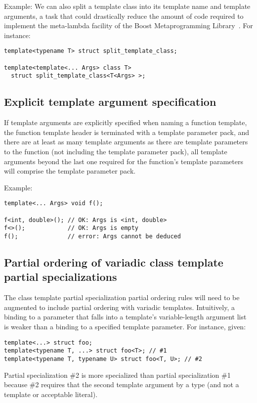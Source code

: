 \documentclass{article}
\begin{document}
Example: We can also split a template class into its template name and
template arguments, a task that could drastically reduce the amount of code required to implement the meta-lambda facility of the Boost Metaprogramming Library~\cite{Gurtovoy02}. For instance:

\begin{verbatim}
template<typename T> struct split_template_class;

template<template<... Args> class T> 
  struct split_template_class<T<Args> >;
\end{verbatim}

\subsection{Explicit template argument specification}
If template arguments are explicitly specified when naming a function
template, the function template header is terminated with a template
parameter pack, and there are at least as many template arguments as
there are template parameters to the function (not including the
template parameter pack), all template arguments beyond the last one
required for the function's template parameters will comprise the
template parameter pack.

Example:
\begin{verbatim}
template<... Args> void f();

f<int, double>(); // OK: Args is <int, double>
f<>();            // OK: Args is empty
f();              // error: Args cannot be deduced
\end{verbatim}

\subsection{Partial ordering of variadic class template partial specializations}
The class template partial specialization partial ordering rules will
need to be augmented to include partial ordering with variadic
templates. Intuitively, a binding to a parameter that falls into a
template's variable-length argument list is weaker than a binding to a
specified template parameter. For instance, given:

\begin{verbatim}
template<...> struct foo;
template<typename T, ...> struct foo<T>; // #1
template<typename T, typename U> struct foo<T, U>; // #2
\end{verbatim}

Partial specialization \#2 is more specialized than partial
specialization \#1 because \#2 requires that the second template
argument by a type (and not a template or acceptable
literal). 
\end{document}
